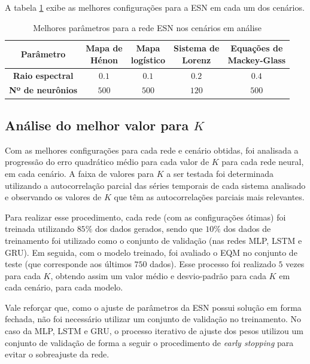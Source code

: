 \documentclass{article}
\begin{document}
A tabela \ref{tab:esn} exibe as melhores configurações para a ESN em cada um dos cenários.
\begin{table}[H]
\begin{center}
\begin{tabular}{c c c c c}
  \textbf{Parâmetro} & \pbox{0.7cm}{\centering \textbf{Mapa de\newline Hénon}} & \pbox{0.6cm}{\centering \textbf{Mapa\newline logístico}} & \pbox{1.0cm}{\centering \textbf{Sistema de\newline Lorenz}} & \pbox{1.1cm}{\centering \textbf{Equações de\newline Mackey-Glass}}\\
 \hline
 \addlinespace
 {\centering \textbf{Raio espectral}} & $0.1$ & $0.1$ & $0.2$ & $0.4$\\  
  \addlinespace
 {\centering \textbf{Nº de neurônios}} & $500$ & $500$ & $120$ & $500$\\ 
\end{tabular}
\caption{Melhores parâmetros para a rede ESN nos cenários em análise}
\label{tab:esn}
\end{center}
\end{table}

\subsection{Análise do melhor valor para $K$}

Com as melhores configurações para cada rede e cenário obtidas, foi analisada a progressão do erro quadrático médio para cada valor de $K$ para cada rede neural, em cada cenário. A faixa de valores para $K$ a ser testada foi determinada utilizando a autocorrelação parcial das séries temporais de cada sistema analisado e observando os valores de $K$ que têm as autocorrelações parciais mais relevantes.

Para realizar esse procedimento, cada rede (com as configurações ótimas) foi treinada utilizando $85\%$ dos dados gerados, sendo que $10\%$ dos dados de treinamento foi utilizado como o conjunto de validação (nas redes MLP, LSTM e GRU). Em seguida, com o modelo treinado, foi avaliado o EQM no conjunto de teste (que corresponde aos últimos $750$ dados). Esse processo foi realizado $5$ vezes para cada $K$, obtendo assim um valor médio e desvio-padrão para cada $K$ em cada cenário, para cada modelo.

Vale reforçar que, como o ajuste de parâmetros da ESN possui solução em forma fechada, não foi necessário utilizar um conjunto de validação no treinamento. No caso da MLP, LSTM e GRU, o processo iterativo de ajuste dos pesos utilizou um conjunto de validação de forma a seguir o procedimento de \textit{early stopping} para evitar o sobreajuste da rede.
\end{document}
